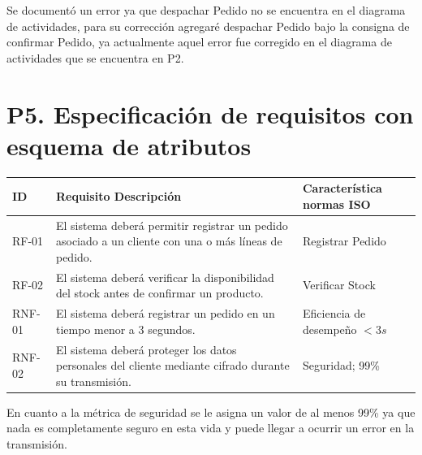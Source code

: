 \documentclass[12pt,a4paper]{article}
\begin{document}
Se documentó un error ya que despachar Pedido no se encuentra en el
diagrama de actividades, para su corrección agregaré despachar Pedido
bajo la consigna de confirmar Pedido, ya actualmente aquel error fue
corregido en el diagrama de actividades que se encuentra en P2.


\section*{P5. Especificación de requisitos con esquema de atributos}

\begin{table}[H]
\centering
\small

\begin{tabularx}{\textwidth}{
|>{\raggedright\arraybackslash}p{1.5cm}
|>{\raggedright\arraybackslash}X
|>{\raggedright\arraybackslash}p{4cm}|
}
\hline

\textbf{ID} &
\textbf{Requisito Descripción} &
\textbf{Característica normas ISO} \\
\hline

RF-01 &
El sistema deberá permitir registrar un pedido asociado a un cliente
con una o más líneas de pedido. &
Registrar Pedido \\
\hline

RF-02 &
El sistema deberá verificar la disponibilidad del stock antes de
confirmar un producto. &
Verificar Stock \\
\hline

RNF-01 &
El sistema deberá registrar un pedido en un tiempo menor a 3 segundos. &
Eficiencia de desempeño $<3s$ \\
\hline

RNF-02 &
El sistema deberá proteger los datos personales del cliente mediante
cifrado durante su transmisión. &
Seguridad; 99\% \\
\hline

\end{tabularx}
\end{table}

En cuanto a la métrica de seguridad se le asigna un valor de al menos
99\% ya que nada es completamente seguro en esta vida y puede llegar
a ocurrir un error en la transmisión.

\end{document}
